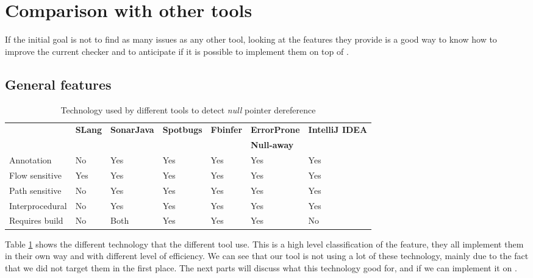 \section{Comparison with other tools}
\label{sec:comparison}

If the initial goal is not to find as many issues as any other tool, looking at the features they provide is a good way to know how to improve the current checker and to anticipate if it is possible to implement them on top of \slang{}.


\subsection{General features}
\label{subsec:general_features}

\begin{table}[h]
	\centering
	\caption{Technology used by different tools to detect \emph{null} pointer dereference}
	\label{table:tools_features}
	\begin{tabular}{|l|llllll|}
		\hline
		& \bf SLang & \bf SonarJava & \bf Spotbugs & \bf Fbinfer  & \bf ErrorProne & \bf IntelliJ IDEA \\ 
		&&&&& \bf Null-away & \\ \hline
		Annotation & No    & Yes       & Yes              & Yes      & Yes                   & Yes           \\
		Flow sensitive       & Yes   & Yes       & Yes              & Yes      & Yes                   & Yes           \\
		Path sensitive       & No    & Yes       & Yes              & Yes      & Yes                   & Yes           \\
		Interprocedural      & No    & Yes       & Yes   & Yes      & Yes                   & Yes           \\
		Requires build       & No    & Both      & Yes              & Yes      & Yes                   & No    \\   
		\hline    
	\end{tabular}
\end{table}

Table \ref{table:tools_features} shows the different technology that the different tool use. 
This is a high level classification of the feature, they all implement them in their own way and with different level of efficiency. 
We can see that our tool is not using a lot of these technology, mainly due to the fact that we did not target them in the first place. 
The next parts will discuss what this technology good for, and if we can implement it on \slang{}.


